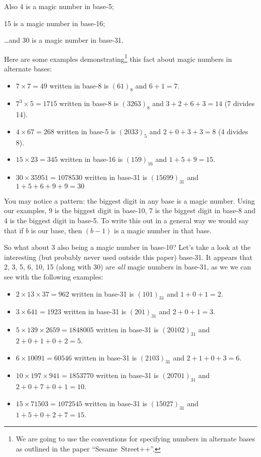 \documentclass{article}
\begin{document}
Also 4 is a magic number
in base-5;

15 is a magic number in base-16;

\dots{}and 30 is a magic number in base-31.

\break
Here are some examples demonstrating\footnote{We are going to use the conventions for specifying
numbers in alternate bases as outlined in the paper ``Sesame~Street++''.} this fact about magic numbers
in alternate bases:
\begin{itemize}
\item $7\times{}7=49$ written in base-8 is $(61)_8$ and $6+1=7$.
\item $7^3\times{}5=1715$ written in base-8 is $(3263)_8$ and $3+2+6+3=14$ (7 divides 14).
\item $4\times{}67=268$ written in base-5 is $(2033)_5$ and $2+0+3+3=8$ (4 divides 8).
\item $15\times{}23=345$ written in base-16 is $(159)_{16}$ and $1+5+9=15$.
\item $30\times{}35951=1078530$ written in base-31 is $(15699)_{31}$ and $1+5+6+9+9=30$
\end{itemize}

You may notice a pattern: the biggest digit in any base is a magic number.  Using our examples, 9 is the biggest
digit in base-10, 7 is the biggest digit in base-8 and 4 is the biggest digit in base-5.  To write this out in a general way
we would say that if $b$ is our base, then $(b-1)$ is a magic number in that base.

So what about 3 also being a magic number in base-10?  Let's take a look at the interesting (but probably never used outside this paper) base-31.
It appears that 2, 3, 5, 6, 10, 15 (along with 30) are \emph{all} magic numbers in base-31, as we we can see
with the following examples:
\begin{itemize}
\item $2\times{}13\times{}37=962$ written in base-31 is $(101)_{31}$ and $1+0+1=2$.
\item $3\times{}641=1923$ written in base-31 is $(201)_{31}$ and $2+0+1=3$.
\item $5\times{}139\times{}2659=1848005$ written in base-31 is $(20102)_{31}$ and $2+0+1+0+2=5$.
\item $6\times{}10091=60546$ written in base-31 is $(2103)_{31}$ and $2+1+0+3=6$.
\item $10\times{}197\times{}941=1853770$ written in base-31 is $(20701)_{31}$ and $2+0+7+0+1=10$.
\item $15\times{}71503=1072545$ written in base-31 is $(15027)_{31}$ and $1+5+0+2+7=15$.
\end{itemize}
\end{document}
